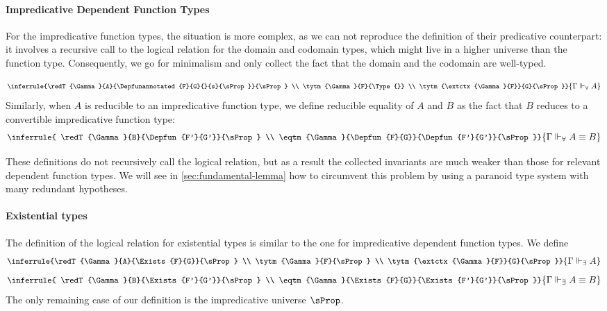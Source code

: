 \paragraph{Impredicative Dependent Function Types}

For the impredicative function types, the situation is more complex,
as we can not reproduce the definition of their predicative
counterpart:
it involves a recursive call to the logical relation for the domain
and codomain types, which might live in a higher universe than the
function type.
%
Consequently, we go for minimalism and only collect the fact that the domain
and the codomain are well-typed.

  \[
{\small
  \inferrule{\redT{\Gamma}{A}{\Depfunannotated{F}{G}{}{s}{\sProp}}{\sProp}
            \\ \tytm{\Gamma}{F}{\Type{}}
            \\ \tytm{\extctx{\Gamma}{F}}{G}{\sProp}}
            {\Gamma \Vdash_\forall A}
          }\]
%
Similarly, when $A$ is reducible to an impredicative function type,
we define reducible equality of $A$ and $B$ as the fact that $B$
reduces to a convertible impredicative function type:
  \[
{\small
  \inferrule{ \redT{\Gamma}{B}{\Depfun{F'}{G'}}{\sProp}
            \\  \eqtm{\Gamma}{\Depfun{F}{G}}{\Depfun{F'}{G'}}{\sProp}}
            {\Gamma \Vdash_\forall A \equiv B}
          }\]

These definitions do not recursively call the logical relation,
but as a result the collected invariants are
much weaker than those for relevant dependent function
types. We will see in \cref{sec:fundamental-lemma} how to
circumvent this problem by using a paranoid type system with
many redundant hypotheses.


\paragraph{Existential types}

The definition of the logical relation for existential types is
similar to the one for impredicative dependent function types. We define
  \[
{\small
  \inferrule{\redT{\Gamma}{A}{\Exists{F}{G}}{\sProp}
            \\ \tytm{\Gamma}{F}{\sProp}
            \\ \tytm{\extctx{\Gamma}{F}}{G}{\sProp}}
            {\Gamma \Vdash_\exists A}
          }\]
%
  \[
{\small
  \inferrule{ \redT{\Gamma}{B}{\Exists{F'}{G'}}{\sProp}
            \\  \eqtm{\Gamma}{\Exists{F}{G}}{\Exists{F'}{G'}}{\sProp}}
            {\Gamma \Vdash_\exists A \equiv B}
          }\]
The only remaining case of our definition is the impredicative universe $\sProp$.

